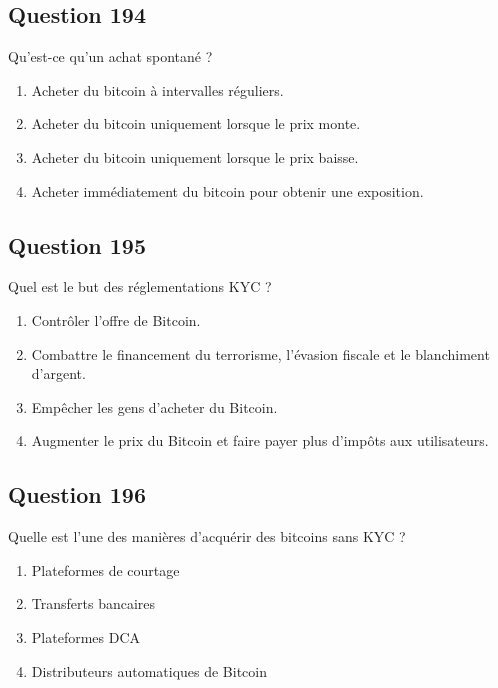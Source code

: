 \documentclass[12pt,a4paper]{article}
\begin{document}
\bigskip


\subsection*{Question 194}
Qu'est-ce qu'un achat spontané ?

\begin{enumerate}[label=\Alph*., leftmargin=*]
\item Acheter du bitcoin à intervalles réguliers.
\item Acheter du bitcoin uniquement lorsque le prix monte.
\item Acheter du bitcoin uniquement lorsque le prix baisse.
\item Acheter immédiatement du bitcoin pour obtenir une exposition.
\end{enumerate}

\bigskip


\subsection*{Question 195}
Quel est le but des réglementations KYC ?

\begin{enumerate}[label=\Alph*., leftmargin=*]
\item Contrôler l'offre de Bitcoin.
\item Combattre le financement du terrorisme, l'évasion fiscale et le blanchiment d'argent.
\item Empêcher les gens d'acheter du Bitcoin.
\item Augmenter le prix du Bitcoin et faire payer plus d'impôts aux utilisateurs.
\end{enumerate}

\bigskip


\subsection*{Question 196}
Quelle est l'une des manières d'acquérir des bitcoins sans KYC ?

\begin{enumerate}[label=\Alph*., leftmargin=*]
\item Plateformes de courtage
\item Transferts bancaires
\item Plateformes DCA
\item Distributeurs automatiques de Bitcoin
\end{enumerate}
\end{document}
